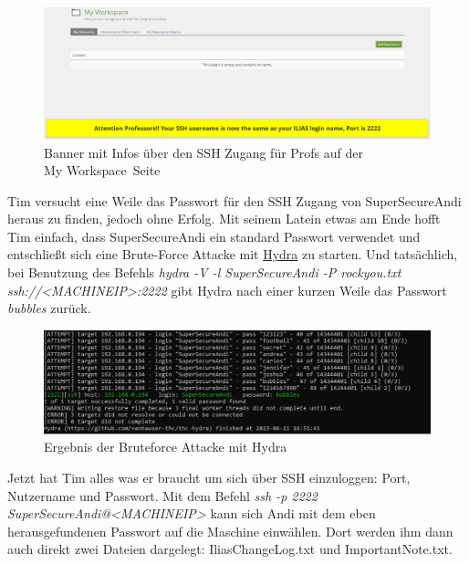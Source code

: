 \documentclass[10pt, a4paper,onecolumn ,titlepage]{article}
\begin{document}
    \begin{figure}[H]
        \centering
        \includegraphics[width=1\textwidth]{VM1_Bilder/YellowBanner.PNG}
        \caption{Banner mit Infos über den SSH Zugang für Profs auf der \\ \glqq My Workspace\grqq\ Seite}
        \label{fig:YellowBanner}
    \end{figure}

    \noindent
    Tim versucht eine Weile das Passwort für den SSH Zugang von SuperSecureAndi heraus zu finden, jedoch ohne Erfolg. Mit seinem Latein etwas am Ende hofft Tim einfach,
    dass SuperSecureAndi ein standard Passwort verwendet und entschließt sich eine Brute-Force Attacke mit \href{https://github.com/vanhauser-thc/thc-hydra}{Hydra}
    zu starten. Und tatsächlich, bei Benutzung des Befehls \textit{hydra -V -l SuperSecureAndi -P rockyou.txt ssh://<MACHINEIP>:2222} gibt Hydra nach einer kurzen Weile das Passwort \textit{bubbles} zurück.

    \begin{figure}[H]
        \centering
        \includegraphics[width=1\textwidth]{VM1_Bilder/HydraBruteforce.PNG}
        \caption{Ergebnis der Bruteforce Attacke mit Hydra}
        \label{fig:HydraBruteforce}
    \end{figure}

    \noindent
    Jetzt hat Tim alles was er braucht um sich über SSH einzuloggen:
    Port, Nutzername und Passwort. Mit dem Befehl \textit{ssh -p 2222 SuperSecureAndi@<MACHINEIP>} kann sich Andi mit dem eben herausgefundenen Passwort auf die Maschine einwählen.
    Dort werden ihm dann auch direkt zwei Dateien dargelegt: IliasChangeLog.txt und ImportantNote.txt.
\end{document}
